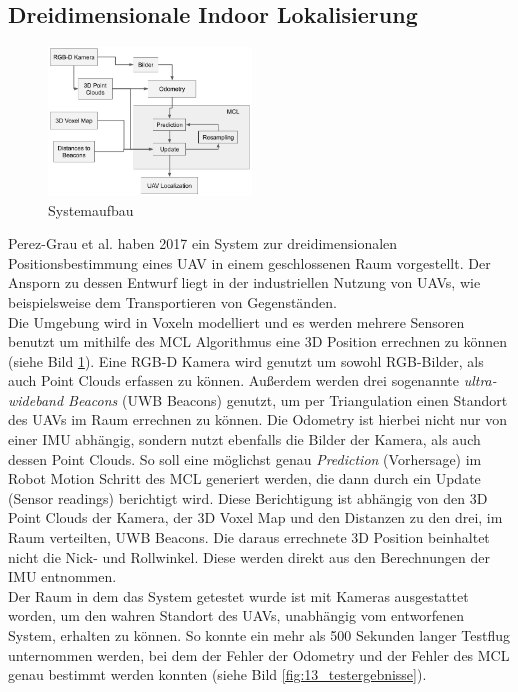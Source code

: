 \subsection{Dreidimensionale Indoor Lokalisierung}\label{subsec:3d_indoor}
\begin{figure}
    \centering
    \includegraphics[width=0.48\textwidth]{pic/loesungen/13_system.png}
    \caption{Systemaufbau}
    \label{fig:13_system}
\end{figure}
Perez-Grau et al. \cite{dreidimensionale_indoor_lokalisierung} haben 2017 ein System zur dreidimensionalen Positionsbestimmung eines UAV in einem geschlossenen Raum vorgestellt. Der Ansporn zu dessen Entwurf liegt in der industriellen Nutzung von UAVs, wie beispielsweise dem Transportieren von Gegenständen.\\
Die Umgebung wird in Voxeln modelliert und es werden mehrere Sensoren benutzt um mithilfe des MCL Algorithmus eine 3D Position errechnen zu können (siehe Bild \ref{fig:13_system}). Eine RGB-D Kamera wird genutzt um sowohl RGB-Bilder, als auch Point Clouds erfassen zu können. Außerdem werden drei sogenannte \textit{ultra-wideband Beacons} (UWB Beacons) genutzt, um per Triangulation einen Standort des UAVs im Raum errechnen zu können. Die Odometry ist hierbei nicht nur von einer IMU abhängig, sondern nutzt ebenfalls die Bilder der Kamera, als auch dessen Point Clouds. So soll eine möglichst genau \textit{Prediction} (Vorhersage) im Robot Motion Schritt des MCL generiert werden, die dann durch ein Update (Sensor readings) berichtigt wird. Diese Berichtigung ist abhängig von den 3D Point Clouds der Kamera, der 3D Voxel Map und den Distanzen zu den drei, im Raum verteilten, UWB Beacons. Die daraus errechnete 3D Position beinhaltet nicht die Nick- und Rollwinkel. Diese werden direkt aus den Berechnungen der IMU entnommen.\\
Der Raum in dem das System getestet wurde ist mit Kameras ausgestattet worden, um den wahren Standort des UAVs, unabhängig vom entworfenen System, erhalten zu können. So konnte ein mehr als 500 Sekunden langer Testflug unternommen werden, bei dem der Fehler der Odometry und der Fehler des MCL genau bestimmt werden konnten (siehe Bild \ref{fig:13_testergebnisse}).
